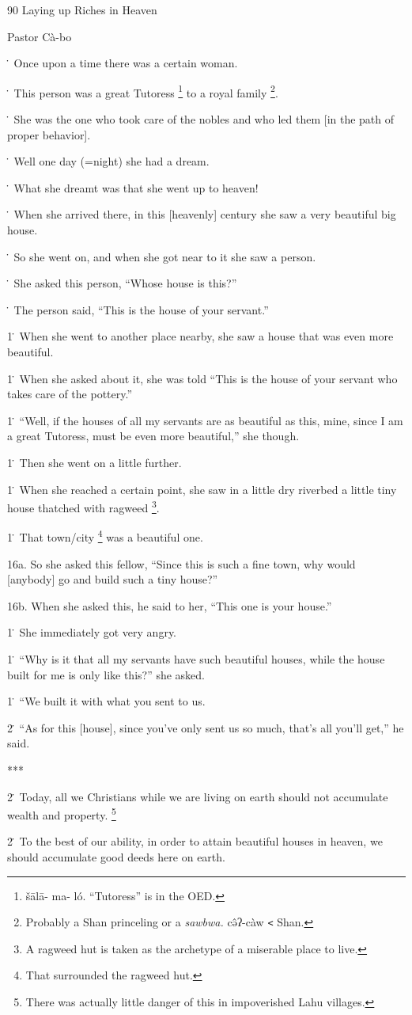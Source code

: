 
90 Laying up Riches in Heaven

Pastor Cà-bo

\. Once upon a time there was a certain woman.

\. This person was a great Tutoress \footnote{šālā-     ma-   ló. ``Tutoress'' is in the OED.} to a royal family \footnote{Probably a Shan princeling or a \textit{sawbwa. }cə̂ʔ-càw \texttt{<} Shan.}.

\. She was the one who took care of the nobles and who led them [in the path of
proper behavior].

\. Well one day (=night) she had a dream.

\. What she dreamt was that she went up to heaven!

\. When she arrived there, in this [heavenly] century she saw a very beautiful
big house.

\. So she went on, and when she got near to it she saw a person.

\. She asked this person, ``Whose house is this?''

\. The person said, ``This is the house of your servant.''

1\. When she went to another place nearby, she saw a house that was even more beautiful.

1\. When she asked about it, she was told ``This is the house of your servant who
takes care of the pottery.''

1\. ``Well, if the houses of all my servants are as beautiful as this, mine, since
I am a great Tutoress, must be even more beautiful,'' she though.

1\. Then she went on a little further.

1\. When she reached a certain point, she saw in a little dry riverbed a little
tiny house thatched with ragweed \footnote{A ragweed hut is taken as the archetype of a miserable place to live.}.

1\. That town/city \footnote{That surrounded the ragweed hut.} was a beautiful one.

16a. So she asked this fellow, ``Since this is such a fine town, why would [anybody]
go and build such a tiny house?''

16b. When she asked this, he said to her, ``This one is your house.''

1\. She immediately got very angry.

1\. ``Why is it that all my servants have such beautiful houses, while the house
built for me is only like this?'' she asked.

1\. ``We built it with what you sent to us.

2\. ``As for this [house], since you've only sent us so much, that's all you'll
get,'' he said.

***

2\. Today, all we Christians while we are living on earth should not accumulate
wealth and property. \footnote{There was actually little danger of this in impoverished Lahu villages.}

2\. To the best of our ability, in order to attain beautiful houses in heaven,
we should accumulate good deeds here on earth.

